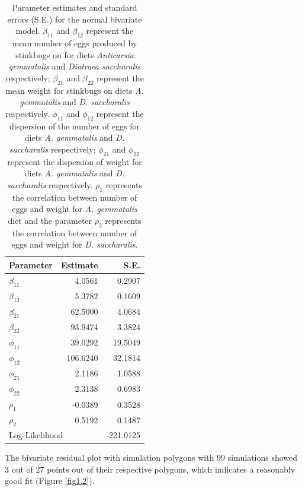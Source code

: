 \documentclass[useAMS,referee]{biom}
\begin{document}
\begin{table}[htb]
\caption{Parameter estimates and standard errors (S.E.) for
the normal bivariate model. $\beta_{11}$ and $\beta_{12}$ represent the mean number of eggs produced by stinkbugs on for diets \textit{Anticarsia gemmatalis} and \textit{Diatraea saccharalis} respectively; $\beta_{21}$ and $\beta_{22}$ represent the mean weight for stinkbugs on diets \textit{A. gemmatalis} and \textit{D. saccharalis} respectively. $\phi_{11}$ and $\phi_{12}$ represent the dispersion of the number of eggs for diets \textit{A. gemmatalis} and \textit{D. saccharalis} respectively; $\phi_{21}$ and $\phi_{22}$ represent the dispersion of weight for diets \textit{A. gemmatalis} and \textit{D. saccharalis} respectively. $\rho_1$ represents the correlation between number of eggs and weight for \textit{A. gemmatalis} diet and the parameter $\rho_2$ represents the correlation between number of eggs and weight for \textit{D. saccharalis}.}
\label{table0}
\begin{center}
\begin{tabular}{lrr}
	\hline
	Parameter & Estimate & S.E. \\ \hline
	$\beta_{11}$ & 4.0561 & 0.2907 \\ 
	$\beta_{12}$ &  5.3782 & 0.1609 \\
	
	$\beta_{21}$& 62.5000 & 4.0684  \\
	
	$\beta_{22}$& 93.9474 & 3.3824\\
	
	$\phi_{11}$& 39.0292 & 19.5049 \\ 
	$\phi_{12}$&  106.6240  & 32.1814\\
	$\phi_{21}$&  2.1186 & 1.0588  \\ 
	$\phi_{22}$& 2.3138 &0.6983\\
	$\rho_1$ & -0.0389 & 0.3528 \\
	
	$\rho_2$& 0.5192 & 0.1487\\
	\hline
	\multicolumn{2}{l}{Log-Likelihood} & -221.0125 \\
	\hline
\end{tabular}
\end{center}
\end{table}


The bivariate residual plot with simulation polygons with 99 simulations showed 3 out of 27 points out of their respective polygons, which indicates a reasonably good fit (Figure \ref{fig1.2}). 
\end{document}

